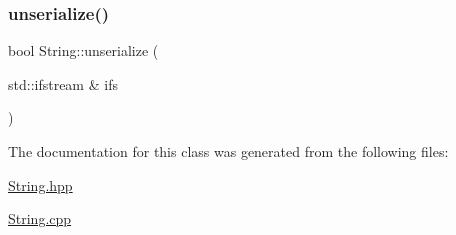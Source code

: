 \mbox{\label{classString_a66de7cb14dd606a96dbe3fa8b6aff065}} 
\subsubsection{\texorpdfstring{unserialize()}{unserialize()}}
{\footnotesize\ttfamily bool String\+::unserialize (\begin{DoxyParamCaption}\item[{std\+::ifstream \&}]{ifs }\end{DoxyParamCaption})}



The documentation for this class was generated from the following files\+:\begin{DoxyCompactItemize}
\item 
\hyperlink{String_8hpp}{String.\+hpp}\item 
\hyperlink{String_8cpp}{String.\+cpp}\end{DoxyCompactItemize}
